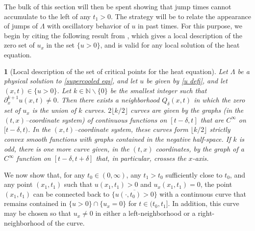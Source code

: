 \documentclass{article}
\numberwithin{equation}{section}
\numberwithin{figure}{section}
\theoremstyle{plain}
\theoremstyle{plain}
\theoremstyle{plain}
\theoremstyle{plain}
\newtheorem{lem}[thm]{\protect\lemmaname}
\theoremstyle{definition}
\theoremstyle{remark}
\providecommand{\lemmaname}{Lemma}
\begin{document}
The bulk of this section will then be spent showing that jump times cannot accumulate to the left of any $t_1>0$. The strategy will be to relate the appearance of jumps of $\Lambda$ with oscillatory behavior of $u$ in past times. For this purpose, we begin by citing the following result from \cite[Lem. 4.2]{delarue}, which gives a local description of the zero set of $u_x$ in the set $\{u>0\}$, and is valid for any local solution of the heat equation.
\begin{lem}[Local description of the set of critical points for the heat equation] \label{lem: zero set} Let $\Lambda$ be a physical solution to \eqref{supercooled eqs}, and let $u$ be given by \eqref{u defi}, and let $(x,t)\in \{u>0\}$. Let $k\in \mathbb{N}\backslash\{0\}$ be the smallest integer such that $\partial^{k+1}_xu(x,t) \neq 0$. Then there exists a neighborhood $Q_{\delta}(x,t)$ in which the zero set of $u_x$ is the union of $k$ curves. $2\lfloor k/2\rfloor$ curves are given by the graphs (in the $(t,x)$--coordinate system) of continuous functions on $[t-\delta,t]$ that are $C^{\infty}$ on $[t-\delta,t)$. In the $(x,t)$--coordinate system, these curves form $\lfloor k/2 \rfloor$ strictly convex smooth functions with graphs contained in the negative half-space. If $k$ is odd, there is one more curve given, in the $(t,x)$ coordinates, by the graph of a $C^{\infty}$ function on $[t-\delta,t+\delta]$ that, in particular, crosses the $x$-axis.
    
\end{lem}
We now show that, for any $t_0\in (0,\infty)$, any $t_1>t_0$ sufficiently close to $t_0$, and any point $(x_1,t_1)$ such that $u(x_1,t_1)>0$ and $u_x(x_1,t_1)=0$, the point $(x_1,t_1)$ can be connected back to $\overline{\{u(\cdot,t_0)>0\}}$ with a continuous curve that remains contained in $\{u>0\}\cap\{u_x=0\}$ for $t\in (t_0,t_1]$. In addition, this curve may be chosen so that $u_x \neq 0$ in either a left-neighborhood or a right-neighborhood of the curve. 
\end{document}
